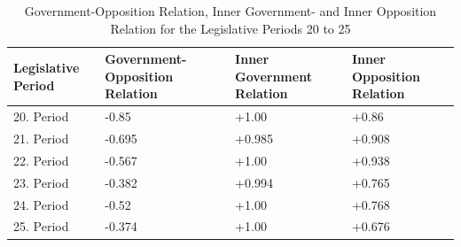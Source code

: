 \begin{table}[h]

\centering
\bgroup
\def\arraystretch{1.2}
\begin{tabular}{| p{2cm} | p{3cm} | p{3cm} | p{3cm} |}
\hline
  Legislative Period & Government-Opposition Relation & Inner Government Relation & Inner Opposition Relation \\
\hline
\hline
  20. Period & -0.85 & +1.00 & +0.86 \\
\hline
  21. Period & -0.695 & +0.985 & +0.908 \\
\hline
  22. Period & -0.567 & +1.00 & +0.938 \\
\hline
  23. Period & -0.382 & +0.994 & +0.765\\
\hline
  24. Period & -0.52 & +1.00 & +0.768\\
\hline
  25. Period & -0.374 & +1.00 & +0.676\\
\hline

\end{tabular}
\egroup
\caption{Government-Opposition Relation, Inner Government- and Inner Opposition Relation for the Legislative Periods 20 to 25}
\label{table:gov_opp_relation}
\end{table}